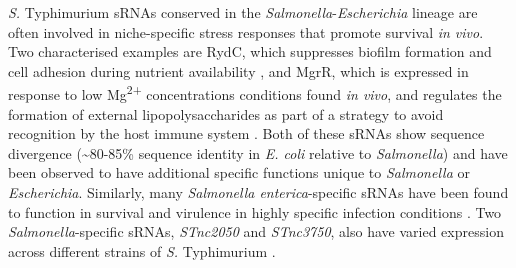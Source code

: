 \textit{S.} Typhimurium sRNAs conserved in the \textit{Salmonella}-\textit{Escherichia} lineage are often involved in niche-specific stress responses that promote survival \textit{in vivo}. Two characterised examples are RydC, which suppresses biofilm formation and cell adhesion during nutrient availability \citep{Bordeau2014-ul}, and MgrR, which is expressed in response to low Mg\textsuperscript{2+} concentrations conditions found \textit{in vivo}, and regulates the formation of external lipopolysaccharides as part of a strategy to avoid recognition by the host immune system \citep{Moon2009-dd,Moon2013-uu}. Both of these sRNAs show sequence divergence (\textasciitilde80-85\% sequence identity in \textit{E. coli} relative to \textit{Salmonella}) and have been observed to have additional specific functions unique to \textit{Salmonella} or \textit{Escherichia}. Similarly, many \textit{Salmonella enterica}-specific sRNAs have been found to function in survival and virulence in highly specific infection conditions \citep{Colgan2016-hk,Barquist2013-ii}. Two \textit{Salmonella}-specific sRNAs, \textit{STnc2050} and \textit{STnc3750}, also have varied expression across different strains of \textit{S.} Typhimurium \citep{Canals2019-yv}.
